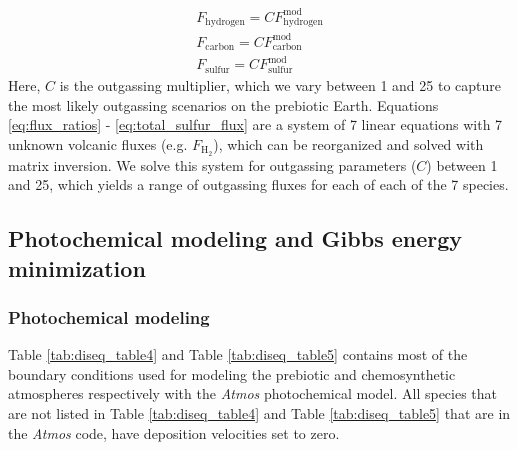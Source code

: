 \begin{gather}
  F_\mathrm{hydrogen} = C F_\mathrm{hydrogen}^\mathrm{mod} \\
  F_\mathrm{carbon} = C F_\mathrm{carbon}^\mathrm{mod} \\
  F_\mathrm{sulfur} = C F_\mathrm{sulfur}^\mathrm{mod}
\end{gather}
Here, $C$ is the outgassing multiplier, which we vary between 1 and 25 to capture the most likely outgassing scenarios on the prebiotic Earth. Equations \eqref{eq:flux_ratios} - \eqref{eq:total_sulfur_flux} are a system of 7 linear equations with 7 unknown volcanic fluxes (e.g. $F_\mathrm{H_2}$), which can be reorganized and solved with matrix inversion. We solve this system for outgassing parameters ($C$) between 1 and 25, which yields a range of outgassing fluxes for each of each of the 7 species.

\subsection{Photochemical modeling and Gibbs energy minimization} \label{sec:diseq_b}

\subsubsection{Photochemical modeling} \label{sec:diseq_b1}

Table \ref{tab:diseq_table4} and Table \ref{tab:diseq_table5} contains most of the boundary conditions used for modeling the prebiotic and chemosynthetic atmospheres respectively with the \textit{Atmos} photochemical model. All species that are not listed in Table \ref{tab:diseq_table4} and Table \ref{tab:diseq_table5} that are in the \textit{Atmos} code, have deposition velocities set to zero.

